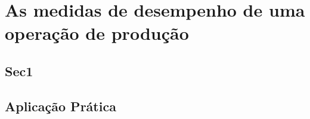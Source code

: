 \chapter{ As medidas de desempenho de uma operação de produção} 
\label{chap:medida_desempenho_operacao_prod} 

\section{Sec1} 
\label{sec:medida_desempenho_operacao_prod_sec1} 


\section{Aplicação Prática} 
\label{sec:medida_desempenho_operacao_prod_aplicacao}